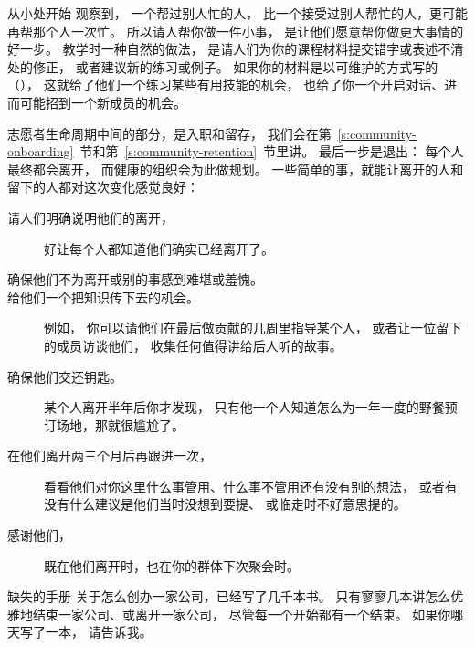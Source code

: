 \begin{aside}{从小处开始}
  观察到，
  一个帮过别人忙的人，
  比一个接受过别人帮忙的人，更可能再帮那个人一次忙。
  所以请人帮你做一件小事，
  是让他们愿意帮你做更大事情的好一步。
  教学时一种自然的做法，
  是请人们为你的课程材料提交错字或表述不清处的修正，
  或者建议新的练习或例子。
  如果你的材料是以可维护的方式写的（），
  这就给了他们一个练习某些有用技能的机会，
  也给了你一个开启对话、进而可能招到一个新成员的机会。
\end{aside}

志愿者生命周期中间的部分，是入职和留存，
我们会在第~\ref{s:community-onboarding}~节和第~\ref{s:community-retention}~节里讲。
最后一步是退出：
每个人最终都会离开，
而健康的组织会为此做规划。
一些简单的事，就能让离开的人和留下的人都对这次变化感觉良好：

\begin{description}

\item[请人们明确说明他们的离开，]
  好让每个人都知道他们确实已经离开了。

\item[确保他们不为离开或别的事感到难堪或羞愧。]

\item[给他们一个把知识传下去的机会。]
  例如，
  你可以请他们在最后做贡献的几周里指导某个人，
  或者让一位留下的成员访谈他们，
  收集任何值得讲给后人听的故事。

\item[确保他们交还钥匙。]
  某个人离开半年后你才发现，
  只有他一个人知道怎么为一年一度的野餐预订场地，那就很尴尬了。

\item[在他们离开两三个月后再跟进一次，]
  看看他们对你这里什么事管用、什么事不管用还有没有别的想法，
  或者有没有什么建议是他们当时没想到要提、
  或临走时不好意思提的。

\item[感谢他们，]
  既在他们离开时，也在你的群体下次聚会时。

\end{description}

\begin{aside}{缺失的手册}
  关于怎么创办一家公司，已经写了几千本书。
  只有寥寥几本讲怎么优雅地结束一家公司、或离开一家公司，
  尽管每一个开始都有一个结束。
  如果你哪天写了一本，
  请告诉我。
\end{aside}

